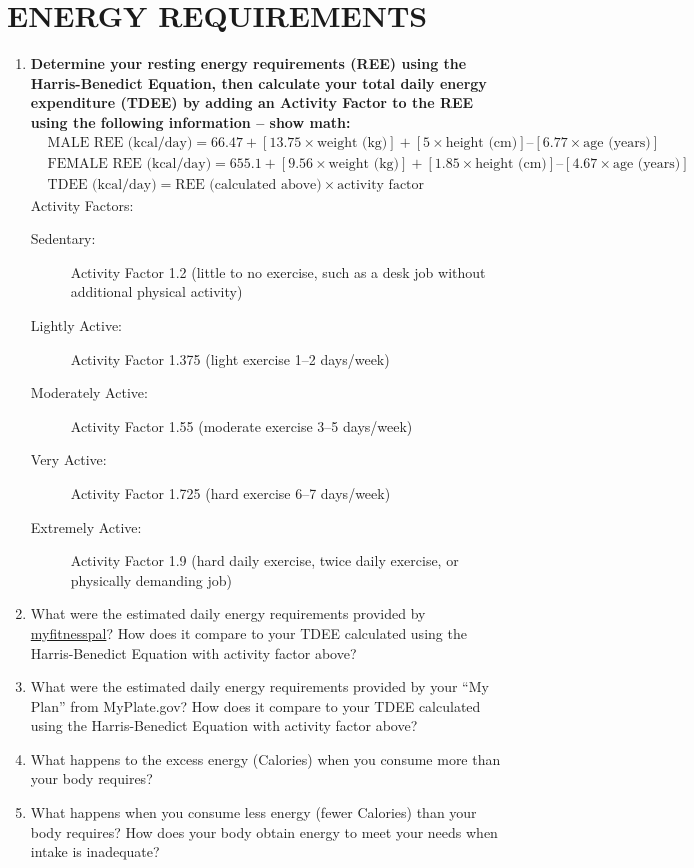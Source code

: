 \documentclass[
	title={Dietary Analysis Assignment - Nutrient Requirements},
	points={30}
]{fdsn201homework}
\begin{document}
\section{ENERGY REQUIREMENTS}\label{sec:energy-requirements}
\begin{enumerate}
	\item \textbf{Determine your resting energy requirements (REE) using the Harris-Benedict Equation, then calculate your total daily energy expenditure (TDEE) by adding an Activity Factor to the REE using the following information – show math:}
	\begin{equation*}
	\begin{aligned}
			&\mbox{MALE REE (kcal/day)} = 66.47 + [13.75 \times \mbox{weight (kg)}] + [5 \times \mbox{height (cm)}] – [6.77 \times \mbox{age (years)}] \\
			&\mbox{FEMALE REE (kcal/day)} = 655.1 + [9.56 \times \mbox{weight (kg)}] + [1.85 \times \mbox{height (cm)}] – [4.67 \times \mbox{age (years)}] \\
			&\mbox{TDEE (kcal/day)} = \mbox{REE (calculated above)} \times \mbox{activity factor}
	\end{aligned}
	\end{equation*}
	Activity Factors:
	\begin{description}
		\item[Sedentary:] Activity Factor 1.2 (little to no exercise, such as a desk job without additional physical activity)
		\item[Lightly Active:] Activity Factor 1.375 (light exercise 1--2 days/week)
		\item[Moderately Active:] Activity Factor 1.55 (moderate exercise 3--5 days/week)
		\item[Very Active:] Activity Factor 1.725 (hard exercise 6--7 days/week)
		\item[Extremely Active:] Activity Factor 1.9 (hard daily exercise, twice daily exercise, or physically demanding job)
	\end{description}
	\item What were the estimated daily energy requirements provided by \href{https://www.myfitnesspal.com/}{myfitnesspal}?
	How does it compare to your TDEE calculated using the Harris-Benedict Equation with activity factor above?

	\item What were the estimated daily energy requirements provided by your “My Plan” from MyPlate.gov?
	How does it compare to your TDEE calculated using the Harris-Benedict Equation with activity factor above?

	\item What happens to the excess energy (Calories) when you consume more than your body requires?

	\item What happens when you consume less energy (fewer Calories) than your body requires?
	How does your body obtain energy to meet your needs when intake is inadequate?
\end{enumerate}
\end{document}
